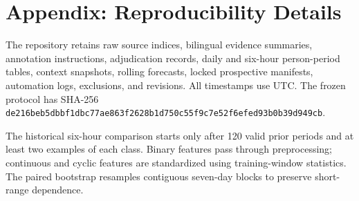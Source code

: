 \section{Appendix: Reproducibility Details}

The repository retains raw source indices, bilingual evidence summaries, annotation instructions,
adjudication records, daily and six-hour person-period tables, context snapshots, rolling forecasts,
locked prospective manifests, automation logs, exclusions, and revisions. All timestamps use UTC.
The frozen protocol has SHA-256
\texttt{de216beb5dbbf1dbc77ae863f2628b1d750c55f9c7e52f6efed93b0b39d949cb}.

The historical six-hour comparison starts only after 120 valid prior periods and at least two
examples of each class. Binary features pass through preprocessing; continuous and cyclic features
are standardized using training-window statistics. The paired bootstrap resamples contiguous
seven-day blocks to preserve short-range dependence.
